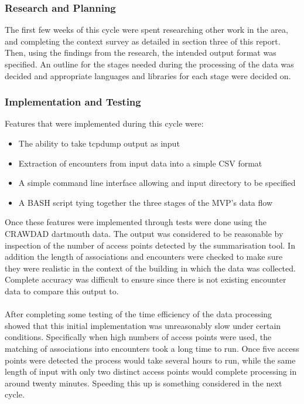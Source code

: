     \subsubsection{Research and Planning}
    The first few weeks of this cycle were spent researching other work in the area, and completing the context survey as detailed in section three of this report. Then, using the findings from the research, the intended output format was specified. An outline for the stages needed during the processing of the data was decided and appropriate languages and libraries for each stage were decided on.
    \subsubsection{Implementation and Testing}
    Features that were implemented during this cycle were:
    \begin{itemize}
        \item The ability to take tcpdump output as input
        \item Extraction of encounters from input data into a simple CSV format 
        \item A simple command line interface allowing and input directory to be specified
        \item A BASH script tying together the three stages of the MVP's data flow
    \end{itemize}
    Once these features were implemented through tests were done using the CRAWDAD dartmouth data. The output was considered to be reasonable by inspection of the number of access points detected by the summarisation tool. In addition the length of associations and encounters were checked to make sure they were realistic in the context of the building in which the data was collected. Complete accuracy was difficult to ensure since there is not existing encounter data to compare this output to.\\\\
    After completing some testing of the time efficiency of the data processing showed that this initial implementation was unreasonably slow under certain conditions. Specifically when high numbers of access points were used, the matching of associations into encounters took a long time to run. Once five access points were detected the process would take several hours to run, while the same length of input with only two distinct access points would complete processing in around twenty minutes. Speeding this up is something considered in the next cycle.
